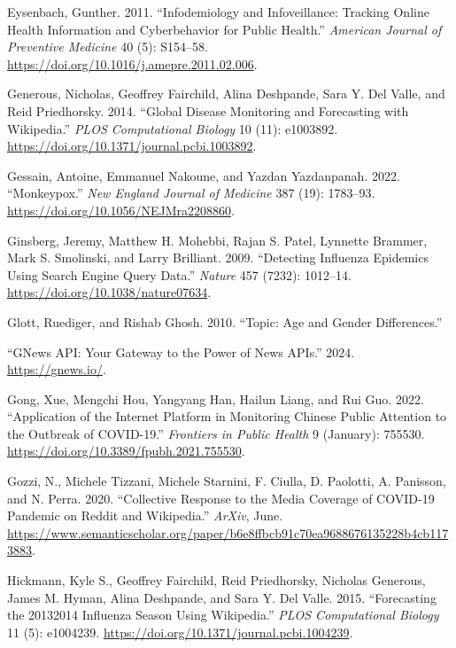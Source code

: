 \documentclass[
  12pt,
]{article}
\newlength{\cslhangindent}
\newenvironment{CSLReferences}[2] %
 {\begin{list}{}{%
  \setlength{\itemindent}{0pt}
  \setlength{\leftmargin}{0pt}
  \setlength{\parsep}{0pt}
  \ifodd #1
   \setlength{\leftmargin}{\cslhangindent}
   \setlength{\itemindent}{-1\cslhangindent}
  \fi
  \setlength{\itemsep}{#2\baselineskip}}}
 {\end{list}}
\begin{document}
\begin{CSLReferences}{1}{0}
Eysenbach, Gunther. 2011. {``Infodemiology and Infoveillance: Tracking
Online Health Information and Cyberbehavior for Public Health.''}
\emph{American Journal of Preventive Medicine} 40 (5): S154--58.
\url{https://doi.org/10.1016/j.amepre.2011.02.006}.

Generous, Nicholas, Geoffrey Fairchild, Alina Deshpande, Sara Y. Del
Valle, and Reid Priedhorsky. 2014. {``Global Disease Monitoring and
Forecasting with Wikipedia.''} \emph{PLOS Computational Biology} 10
(11): e1003892. \url{https://doi.org/10.1371/journal.pcbi.1003892}.

Gessain, Antoine, Emmanuel Nakoune, and Yazdan Yazdanpanah. 2022.
{``Monkeypox.''} \emph{New England Journal of Medicine} 387 (19):
1783--93. \url{https://doi.org/10.1056/NEJMra2208860}.

Ginsberg, Jeremy, Matthew H. Mohebbi, Rajan S. Patel, Lynnette Brammer,
Mark S. Smolinski, and Larry Brilliant. 2009. {``Detecting Influenza
Epidemics Using Search Engine Query Data.''} \emph{Nature} 457 (7232):
1012--14. \url{https://doi.org/10.1038/nature07634}.

Glott, Ruediger, and Rishab Ghosh. 2010. {``Topic: Age and Gender
Differences.''}

{``GNews API: Your Gateway to the Power of News APIs.''} 2024.
\url{https://gnews.io/}.

Gong, Xue, Mengchi Hou, Yangyang Han, Hailun Liang, and Rui Guo. 2022.
{``Application of the Internet Platform in Monitoring Chinese Public
Attention to the Outbreak of COVID-19.''} \emph{Frontiers in Public
Health} 9 (January): 755530.
\url{https://doi.org/10.3389/fpubh.2021.755530}.

Gozzi, N., Michele Tizzani, Michele Starnini, F. Ciulla, D. Paolotti, A.
Panisson, and N. Perra. 2020. {``Collective Response to the Media
Coverage of COVID-19 Pandemic on Reddit and Wikipedia.''} \emph{ArXiv},
June.
\url{https://www.semanticscholar.org/paper/b6e8ffbcb91c70ea9688676135228b4cb1173883}.

Hickmann, Kyle S., Geoffrey Fairchild, Reid Priedhorsky, Nicholas
Generous, James M. Hyman, Alina Deshpande, and Sara Y. Del Valle. 2015.
{``Forecasting the 2013{\textendash}2014 Influenza Season Using
Wikipedia.''} \emph{PLOS Computational Biology} 11 (5): e1004239.
\url{https://doi.org/10.1371/journal.pcbi.1004239}.


\end{CSLReferences}
\end{document}
